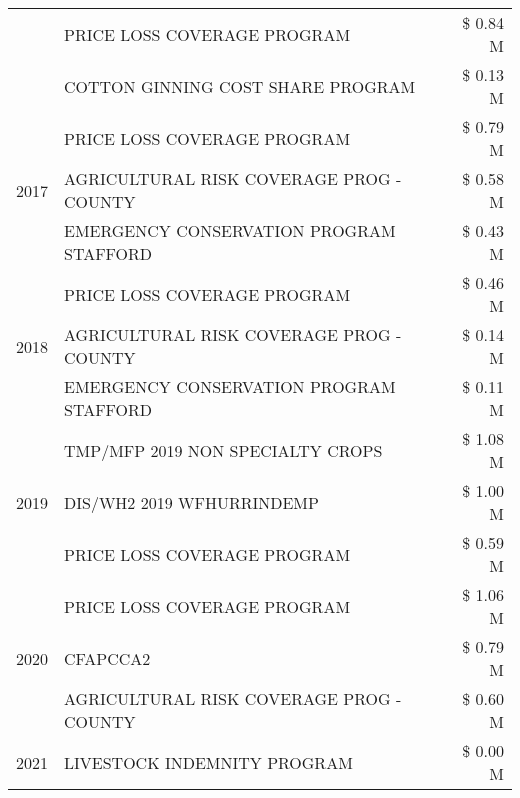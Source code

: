 \begin{tabular}{llr}
 & PRICE LOSS COVERAGE PROGRAM & \$ 0.84 M \\
 & COTTON GINNING COST SHARE PROGRAM & \$ 0.13 M \\
\cline{1-3}
\multirow[t]{3}{*}{2017} & PRICE LOSS COVERAGE PROGRAM & \$ 0.79 M \\
 & AGRICULTURAL RISK COVERAGE PROG - COUNTY & \$ 0.58 M \\
 & EMERGENCY CONSERVATION PROGRAM STAFFORD & \$ 0.43 M \\
\cline{1-3}
\multirow[t]{3}{*}{2018} & PRICE LOSS COVERAGE PROGRAM & \$ 0.46 M \\
 & AGRICULTURAL RISK COVERAGE PROG - COUNTY & \$ 0.14 M \\
 & EMERGENCY CONSERVATION PROGRAM STAFFORD & \$ 0.11 M \\
\cline{1-3}
\multirow[t]{3}{*}{2019} & TMP/MFP 2019 NON SPECIALTY CROPS & \$ 1.08 M \\
 & DIS/WH2 2019 WFHURRINDEMP & \$ 1.00 M \\
 & PRICE LOSS COVERAGE PROGRAM & \$ 0.59 M \\
\cline{1-3}
\multirow[t]{3}{*}{2020} & PRICE LOSS COVERAGE PROGRAM & \$ 1.06 M \\
 & CFAPCCA2 & \$ 0.79 M \\
 & AGRICULTURAL RISK COVERAGE PROG - COUNTY & \$ 0.60 M \\
\cline{1-3}
2021 & LIVESTOCK INDEMNITY PROGRAM & \$ 0.00 M \\
\cline{1-3}
\bottomrule
\end{tabular}
